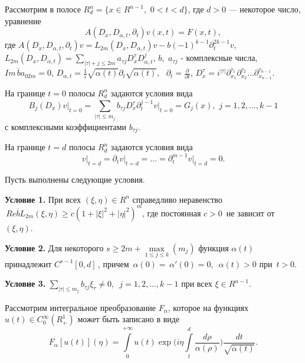 Рассмотрим в полосе $R_d^n = \{x \in R^{n - 1},\,\,0 < t < d\}$, где $d >
0$ --- некоторое число, уравнение
\begin{equation}
\label{eq4500}
A(D_x ,D_{\alpha ,t} ,\partial _t )v(x,t) = F(x,t),
\end{equation}
где
$A(D_x ,D_{\alpha ,t} ,\partial _t )v = L_{2m} (D_x ,D_{\alpha ,t} )v -
b( - 1)^{k - 1}\partial _t^{2k - 1} v$,
\linebreak
$L_{2m} (D_x ,D_{\alpha ,t} ) =
\sum\limits_{\left| \tau \right| + j \le 2m} {a_{\tau j} D_x^\tau D_{\alpha
,t}^j } $, $b,\,\,a_{\tau j} $ - комплексные числа, $Im\,\overline b a_{02m}
= 0$, $D_{\alpha ,t} = \frac{1}{i}\sqrt {\alpha (t)} \partial _t \sqrt
{\alpha (t)} ,\,\,\,\,\partial _t = \frac{\partial }{\partial t}$, $D_x^\tau
= i^{\left| \tau \right|}\partial _{x_1 }^{\tau _1 } \partial _{x_2 }^{\tau
_2 } ...\partial _{x_{n - 1} }^{\tau _{n - 1} } $.

На границе $t = 0$ полосы $R_d^n $ задаются условия вида
\begin{equation}
\label{eq4501}
B_j (D_x )\left. v \right|_{t = 0} = \!\!\! \sum\limits_{\left| \tau \right| \le
m_j } {b_{\tau j} D_x^\tau \partial _t^{j - 1} \left. v \right|_{t = 0} =
G_j (x)} ,\,\,j = 1,2,...,k - 1
\end{equation}
с комплексными коэффициентами $b_{\tau j} $.

На границе $t = d$ полосы $R_d^n $ задаются условия вида
\begin{equation}
\label{eq4502}
\left. v \right|_{t = d} = \partial _t \left. v \right|_{t = d} = ... =
\partial _t^{m - 1} \left. v \right|_{t = d} = 0.
\end{equation}

Пусть выполнены следующие условия.

\textbf{Условие 1.} При всех $(\xi ,\eta ) \in R^n$ справедливо неравенство
$\,Re\overline b L_{2m} (\xi ,\eta ) \ge c(1 + \left| \xi \right|^2 + \left|
\eta \right|^2)^m$, где постоянная $c > 0\,$ не зависит от $(\xi ,\eta )$.

\textbf{Условие 2.} Для некоторого $s \ge 2m + \mathop {\max }\limits_{1 \le
j \le k} (m_j )$ функция $\alpha (t)$ принадлежит $C^{s - 1}[0,d]\,$, причем
$\,\alpha (0) = \,\alpha '(0) = 0,\,\,\,\alpha (t) > 0$ при $\,t > 0$.

\textbf{Условие 3.}
$\sum\limits_{\left| \tau \right| \le m_j } {b_{\tau
j} \xi _\tau \ne 0,\,\,} \,j = 1,2,...,k - 1$ при всех $\xi \in R^{n - 1}$.

Рассмотрим интегральное преобразование $F_\alpha $, которое на функциях
$u(t) \in C_0^\infty (R_ + ^1 )$ может быть записано в виде
\[
F_\alpha [u(t)](\eta ) = \int\limits_0^{ + \infty } {u(t)\exp (i\eta }
\int\limits_t^d {\frac{d\rho }{\alpha (\rho )}} )\frac{dt}{\sqrt {\alpha
(t)} }.
\]

